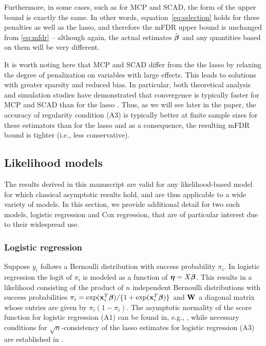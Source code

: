 Furthermore, in some cases, such as for MCP and SCAD, the form of the upper bound is exactly the same.  In other words, equation~\eqref{eq:selection} holds for these penalties as well as the lasso, and therefore the mFDR upper bound is unchanged from \eqref{eq:mfdr} -- although again, the actual estimates $\hat{\boldsymbol{\beta}}$ and any quantities based on them will be very different.

It is worth noting here that MCP and SCAD differ from the the lasso by relaxing the degree of penalization on variables with large effects.  This leads to solutions with greater sparsity and reduced bias.  In particular, both theoretical analysis and simulation studies have demonstrated that convergence is typically faster for MCP and SCAD than for the lasso \citep{MCP,SCAD,Breheny2011}.  Thus, as we will see later in the paper, the accuracy of regularity condition (A3) is typically better at finite sample sizes for these estimators than for the lasso and as a consequence, the resulting mFDR bound is tighter (i.e., less conservative).

\subsection{Likelihood models}

The results derived in this manuscript are valid for any likelihood-based model for which classical asymptotic results hold, and are thus applicable to a wide variety of models.  In this section, we provide additional detail for two such models, logistic regression and Cox regression, that are of particular interest due to their widespread use.

\subsubsection{Logistic regression}

Suppose $y_i$ follows a Bernoulli distribution with success probability $\pi_i$. In logistic regression the logit of $\pi_i$ is modeled as a function of $\boldsymbol{\eta} = X\boldsymbol{\beta}$.  This results in a likelihood consisting of the product of $n$ independent Bernoulli distributions with success probabilities $\pi_i = \exp(\mathbf{x}_i^T\boldsymbol{\beta})/\{1 + \exp(\mathbf{x}_i^T\boldsymbol{\beta})\}$ and $\mathbf{W}$ a diagonal matrix whose entries are given by $\pi_i(1-\pi_i)$.
The asymptotic normality of the score function for logistic regression (A1) can be found in, e.g., \citet{McCullagh1989}, while necessary conditions for $\sqrt{n}$-consistency of the lasso estimates for logistic regression (A3) are established in \citet{SCAD}.

